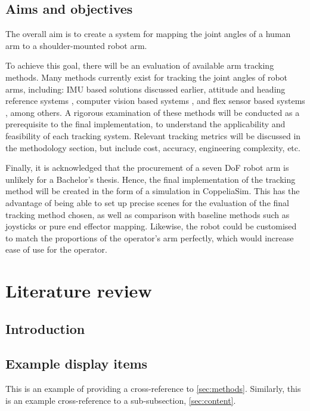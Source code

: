   \subsection{Aims and objectives}
  The overall aim is to create a system for mapping the joint angles of a human arm to a shoulder-mounted robot arm.

  To achieve this goal, there will be an evaluation of available arm tracking methods. 
  Many methods currently exist for tracking the joint angles of robot arms, including: IMU based solutions discussed earlier, attitude and heading reference systems \cite{ref:Mazomenos_Biswas_Cranny_Rajan_Maharatna_Achner_Klemke_Jobges_Ortmann_Langendorfer_2016}, computer vision based systems \cite{ref:Phuong_Cong_2024}, and flex sensor based systems \cite{ref:Nalam_Manivannan_2014}, among others.
  A rigorous examination of these methods will be conducted as a prerequisite to the final implementation, to understand the applicability and feasibility of each tracking system.
  Relevant tracking metrics will be discussed in the methodology section, but include cost, accuracy, engineering complexity, etc.

  Finally, it is acknowledged that the procurement of a seven DoF robot arm is unlikely for a Bachelor's thesis. 
  Hence, the final implementation of the tracking method will be created in the form of a simulation in CoppeliaSim.
  This has the advantage of being able to set up precise scenes for the evaluation of the final tracking method chosen, as well as comparison with baseline methods such as joysticks or pure end effector mapping.
  Likewise, the robot could be customised to match the proportions of the operator's arm perfectly, which would increase ease of use for the operator.


\section{Literature review}

  \subsection{Introduction}
    \lipsum[1] 
  
  \subsection{Example display items}
    This is an example of providing a cross-reference to \autoref{sec:methods}. Similarly, this is an example cross-reference to a sub-subsection, \autoref{sec:content}.
    
